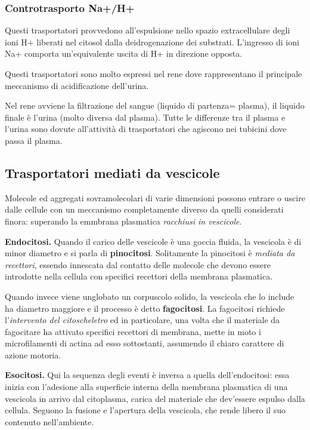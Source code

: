 \documentclass[]{article}
\begin{document}
\subsubsection{Controtrasporto Na+/H+}\label{controtrasporto-nah}

Questi trasportatori provvedono all'espulsione nello spazio
extracellulare degli ioni H+ liberati nel citosol dalla deidrogenazione
dei substrati. L'ingresso di ioni Na+ comporta un'equivalente uscita di
H+ in direzione opposta.

Questi trasportatori sono molto espressi nel rene dove rappresentano il
principale meccanismo di acidificazione dell'urina.

Nel rene avviene la filtrazione del sangue (liquido di partenza=
plasma), il liquido finale è l'urina (molto diversa dal plasma). Tutte
le differenze tra il plasma e l'urina sono dovute all'attività di
trasportatori che agiscono nei tubicini dove passa il plasma.

\subsection{Trasportatori mediati da
vescicole}\label{trasportatori-mediati-da-vescicole}

Molecole ed aggregati sovramolecolari di varie dimensioni possono
entrare o uscire dalle cellule con un meccanismo completamente diverso
da quelli considerati finora: superando la emmbrana plasmatica
\emph{racchiusi in vescicole}.

\textbf{Endocitosi.} Quando il carico delle vescicole è una goccia
fluida, la vescicola è di minor diametro e si parla di
\textbf{pinocitosi}. Solitamente la pinocitosi è \emph{mediata da
recettori}, essendo innescata dal contatto delle molecole che devono
essere introdotte nella cellula con specifici recettori della membrana
plasmatica.

Quando invece viene unglobato un corpuscolo solido, la vescicola che lo
include ha diametro maggiore e il processo è detto \textbf{fagocitosi}.
La fagocitosi richiede l'\emph{intervento del citoscheletro} ed in
particolare, una volta che il materiale da fagocitare ha attivato
specifici recettori di membrana, mette in moto i microfilamenti di
actina ad esso sottostanti, assumendo il chiaro carattere di azione
motoria.

\textbf{Esocitosi.} Qui la sequenza degli eventi è inversa a quella
dell'endocitosi: essa inizia con l'adesione alla superficie interna
della membrana plasmatica di una vescicola in arrivo dal citoplasma,
carica del materiale che dev'essere espulso dalla cellula. Seguono la
fusione e l'apertura della vescicola, che rende libero il suo contenuto
nell'ambiente.
\end{document}
